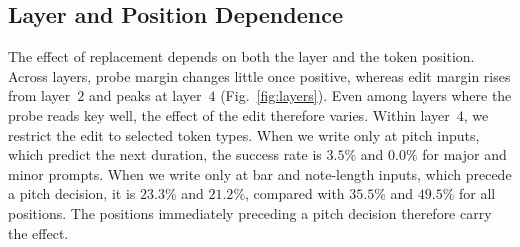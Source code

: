 \documentclass{article}
\begin{document}
\subsection{Layer and Position Dependence}
\label{sec:h5}
The effect of replacement depends on both the layer and the token position.
Across layers, probe margin changes little once positive, whereas edit margin rises from layer~$2$ and peaks at layer~$4$ (Fig.~\ref{fig:layers}).
Even among layers where the probe reads key well, the effect of the edit therefore varies.
Within layer~$4$, we restrict the edit to selected token types.
When we write only at pitch inputs, which predict the next duration, the success rate is $3.5\%$ and $0.0\%$ for major and minor prompts.
When we write only at bar and note-length inputs, which precede a pitch decision, it is $23.3\%$ and $21.2\%$, compared with $35.5\%$ and $49.5\%$ for all positions.
The positions immediately preceding a pitch decision therefore carry the effect.
\end{document}
